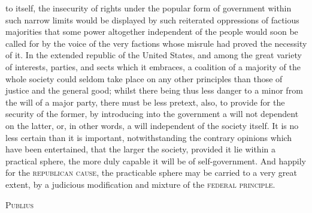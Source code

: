to itself, the insecurity of rights under the popular form of government within such narrow limits would be displayed by such reiterated oppressions of factious majorities that some power altogether independent of the people would soon be called for by the voice of the very factions whose misrule had proved the necessity of it. In the extended republic of the United States, and among the great variety of interests, parties, and sects which it embraces, a coalition of a majority of the whole society could seldom take place on any other principles than those of justice and the general good; whilst there being thus less danger to a minor from the will of a major party, there must be less pretext, also, to provide for the security of the former, by introducing into the government a will not dependent on the latter, or, in other words, a will independent of the society itself. It is no less certain than it is important, notwithstanding the contrary opinions which have been entertained, that the larger the society, provided it lie within a practical sphere, the more duly capable it will be of self-government. And happily for the \textsc{republican cause}, the practicable sphere may be carried to a very great extent, by a judicious modification and mixture of the \textsc{federal principle}.

\vspace{.5cm}
\textsc{Publius}
